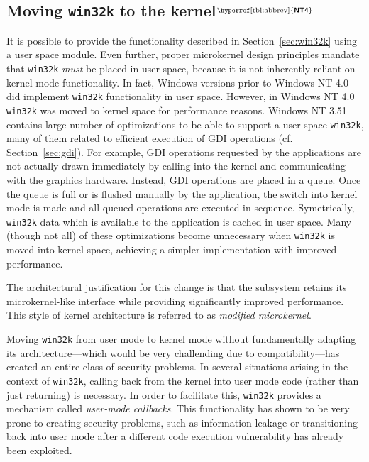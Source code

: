 \documentclass[10pt,twocolumn,a4paper]{article}
\newcommand{\bs}[1]{\textbf{\sffamily #1}}
\newcommand{\winver}[1]{$^{\text{\hyperref[tbl:abbrev]{\bs{#1}}}}$}
\newcommand{\winsubsection}[2]{\subsection[#1]{#1\winver{#2}}}
\begin{document}
		\winsubsection{Moving \texttt{win32k} to the kernel}{NT4}
			It is possible to provide the functionality described in Section~\ref{sec:win32k}
			using a user space module. Even further, proper microkernel design principles
			mandate that \texttt{win32k} \emph{must} be placed in user space, because
			it is not inherently reliant on kernel mode functionality.
			In fact, Windows versions prior to Windows NT 4.0
			did implement \texttt{win32k} functionality in user space. However,
			in Windows NT 4.0 \texttt{win32k} was moved to kernel space for
			performance reasons. Windows NT 3.51 contains large number of optimizations
			to be able to support a user-space \texttt{win32k}, many of them related
			to efficient execution of GDI operations (cf. Section~\ref{sec:gdi}).
			For example, GDI operations requested by the applications are not
			actually drawn immediately by calling into the kernel and communicating
			with the graphics hardware. Instead, GDI operations are placed in a
			queue. Once the queue is full or is flushed manually by the application,
			the switch into kernel mode is made and all queued operations are executed
			in sequence. Symetrically, \texttt{win32k} data which is available to the application
			is cached in user space.
			Many (though not all) of these optimizations become unnecessary when
			\texttt{win32k} is moved into kernel space, achieving a simpler implementation
			with improved performance.
			\cite{gdikernel}

			The architectural justification for this change is that the subsystem
			retains its microkernel-like interface while providing significantly
			improved performance. This style of kernel architecture is referred
			to as \emph{modified microkernel}. \cite{gdikernel}

			Moving \texttt{win32k} from user mode to kernel mode without fundamentally
			adapting its architecture---which would be very challending due to
			compatibility---has created an entire class of security problems.
			In several situations arising in the context of \texttt{win32k},
			calling back from the kernel into user mode code (rather than just
			returning) is necessary. In order to facilitate this, \texttt{win32k}
			provides a mechanism called \textit{user-mode callbacks}. This
			functionality has shown to be very prone to creating security problems,
			such as information leakage or transitioning back into user mode after
			a different code execution vulnerability has already been exploited.
			\cite{mandy2011kernel}
\end{document}

